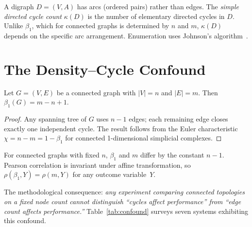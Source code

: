 \documentclass{llncs}
\begin{document}
A digraph $D = (V, A)$ has arcs (ordered pairs) rather than edges. The
\emph{simple directed cycle count} $\kappa(D)$ is the number of elementary
directed cycles in $D$. Unlike $\beta_1$, which for connected graphs is
determined by $n$ and $m$, $\kappa(D)$ depends on the specific arc arrangement.
Enumeration uses Johnson's algorithm~\cite{johnson1975finding}.

\section{The Density--Cycle Confound}
\label{sec:confound}

\begin{theorem}
\label{thm:confound}
Let $G = (V, E)$ be a connected graph with $|V| = n$ and $|E| = m$. Then
$\beta_1(G) = m - n + 1$.
\end{theorem}

\begin{proof}
Any spanning tree of $G$ uses $n - 1$ edges; each remaining edge closes exactly
one independent cycle. The result follows from the Euler characteristic
$\chi = n - m = 1 - \beta_1$ for connected 1-dimensional simplicial complexes.
\end{proof}

\begin{corollary}
\label{cor:pearson}
For connected graphs with fixed $n$, $\beta_1$ and $m$ differ by the constant
$n - 1$. Pearson correlation is invariant under affine transformation, so
$\rho(\beta_1, Y) = \rho(m, Y)$ for any outcome variable~$Y$.
\end{corollary}

The methodological consequence: \emph{any experiment comparing connected
topologies on a fixed node count cannot distinguish ``cycles affect
performance'' from ``edge count affects performance.''}
Table~\ref{tab:confound} surveys seven systems exhibiting this confound.
\end{document}
